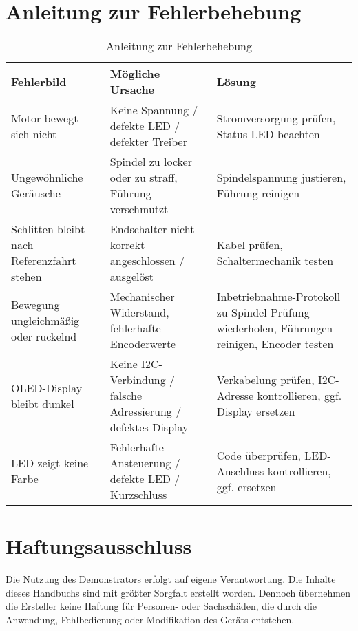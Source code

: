 \documentclass[a4paper,12pt]{report}
\begin{document}
\setlength{\leftskip}{0pt} %

	
	
	\chapter{Anleitung zur Fehlerbehebung}
	\begin{table}[h]
		\centering
		\begin{tabular}{|p{4cm}|p{5cm}|p{4cm}|}
			\hline
			\textbf{Fehlerbild} & \textbf{Mögliche Ursache} & \textbf{Lösung} \\ \hline
			Motor bewegt sich nicht & Keine Spannung / defekte LED / defekter Treiber & Stromversorgung prüfen, Status-LED beachten \\ \hline
			Ungewöhnliche Geräusche & Spindel zu locker oder zu straff, Führung verschmutzt & Spindelspannung justieren, Führung reinigen \\ \hline
			Schlitten bleibt nach Referenzfahrt stehen & Endschalter nicht korrekt angeschlossen / ausgelöst & Kabel prüfen, Schaltermechanik testen \\ \hline
			Bewegung ungleichmäßig oder ruckelnd & Mechanischer Widerstand, fehlerhafte Encoderwerte & Inbetriebnahme-Protokoll zu Spindel-Prüfung wiederholen, Führungen reinigen, Encoder testen \\ \hline
			OLED-Display bleibt dunkel & Keine I2C-Verbindung / falsche Adressierung / defektes Display & Verkabelung prüfen, I2C-Adresse kontrollieren, ggf. Display ersetzen \\ \hline
			LED zeigt keine Farbe & Fehlerhafte Ansteuerung / defekte LED / Kurzschluss & Code überprüfen, LED-Anschluss kontrollieren, ggf. ersetzen \\ \hline
		\end{tabular}
		\caption{Anleitung zur Fehlerbehebung}
		\label{tab:fehlerbehebung}
	\end{table}
	
	
	\chapter{Haftungsausschluss}

		Die Nutzung des Demonstrators erfolgt auf eigene Verantwortung. Die Inhalte dieses Handbuchs sind mit größter Sorgfalt erstellt worden. Dennoch übernehmen die Ersteller keine Haftung für Personen- oder Sachschäden, die durch die Anwendung, Fehlbedienung oder Modifikation des Geräts entstehen. \\
		
\end{document}
